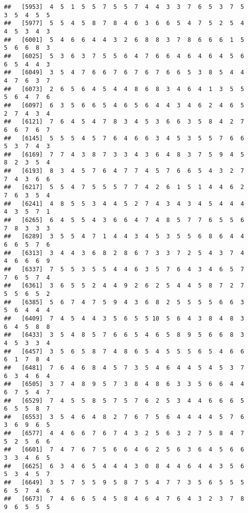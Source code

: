 \documentclass[
]{book}
\begin{document}
\begin{verbatim}
##   [5953]  4  5  1  5  5  7  5  5  7  4  4  3  3  7  6  5  3  7  5  3  5  4  5  5
##   [5977]  5  5  4  5  8  7  8  4  6  3  6  6  5  4  7  5  2  5  4  4  5  3  4  3
##   [6001]  5  4  6  6  4  4  3  2  6  8  8  3  7  8  6  6  6  1  5  5  6  6  8  3
##   [6025]  5  3  6  3  7  5  5  6  4  7  6  6  4  6  4  6  4  5  6  6  5  4  4  3
##   [6049]  3  5  4  7  6  6  7  6  7  6  7  6  6  5  3  8  5  4  4  4  7  6  3  7
##   [6073]  2  6  5  6  4  5  4  4  8  6  8  3  4  6  4  1  3  5  5  5  6  4  7  6
##   [6097]  6  3  5  6  6  5  4  6  5  6  4  4  3  4  6  2  4  6  5  2  7  4  3  4
##   [6121]  7  6  4  5  4  7  8  3  4  5  3  6  6  3  5  8  4  2  7  6  6  7  6  7
##   [6145]  5  5  5  4  5  7  6  4  6  6  3  4  5  3  5  5  7  6  6  5  3  7  4  3
##   [6169]  7  7  4  3  8  7  3  3  4  3  6  4  8  3  7  5  9  4  5  8  2  3  5  4
##   [6193]  8  3  4  5  7  6  4  7  7  4  5  7  6  6  5  4  3  2  7  7  4  3  6  6
##   [6217]  5  5  4  7  5  5  5  7  7  4  2  6  1  5  1  4  4  6  2  7  6  3  5  4
##   [6241]  4  8  5  5  3  4  4  5  2  7  4  3  4  3  4  5  4  4  4  4  3  5  7  1
##   [6265]  6  4  5  5  4  3  6  6  4  7  4  8  5  7  7  6  5  5  6  7  8  3  3  3
##   [6289]  3  5  5  4  7  1  4  4  3  4  5  3  5  5  6  8  6  4  4  6  6  5  7  6
##   [6313]  3  4  4  3  6  8  2  8  6  7  3  3  7  2  5  4  3  7  4  4  6  6  6  9
##   [6337]  7  5  5  3  5  5  4  4  6  3  5  7  6  4  3  4  6  5  7  7  6  5  7  4
##   [6361]  3  6  5  5  2  4  4  9  2  6  2  5  4  4  5  8  7  2  7  5  5  6  5  2
##   [6385]  5  6  7  4  7  5  9  4  3  6  8  2  5  5  5  5  6  6  3  5  6  4  4  4
##   [6409]  7  4  5  4  4  3  5  6  5  5 10  5  6  4  3  8  4  8  3  6  4  5  8  8
##   [6433]  3  5  4  8  5  7  6  6  5  4  6  5  8  9  5  6  6  8  3  4  5  3  3  4
##   [6457]  3  5  6  5  8  7  4  8  6  5  4  5  5  5  6  5  4  6  6  6  1  7  8  4
##   [6481]  7  6  4  6  8  4  5  7  3  5  4  6  4  4  5  4  5  3  7  6  3  4  6  4
##   [6505]  3  7  4  8  9  5  7  3  8  4  8  6  3  3  5  6  6  4  4  6  7  5  4  7
##   [6529]  7  4  5  5  8  5  7  5  7  6  2  5  3  4  4  6  6  6  5  6  5  5  8  7
##   [6553]  3  5  4  6  4  8  2  7  6  7  5  6  4  4  4  4  5  7  6  3  6  9  6  5
##   [6577]  4  4  6  6  7  6  7  4  3  2  5  6  3  2  7  5  8  4  7  5  2  5  6  6
##   [6601]  7  4  7  6  7  5  6  6  4  6  2  5  6  3  6  4  5  6  6  3  3  4  6  5
##   [6625]  6  3  4  6  5  4  4  4  3  0  8  4  4  6  4  4  3  5  6  5  3  4  5  7
##   [6649]  3  5  7  5  5  9  5  8  7  5  4  7  7  3  5  6  5  5  5  6  5  7  4  6
##   [6673]  7  4  6  6  5  4  5  8  4  6  4  7  6  4  3  2  3  7  8  9  6  5  5  5

\end{verbatim}
\end{document}
